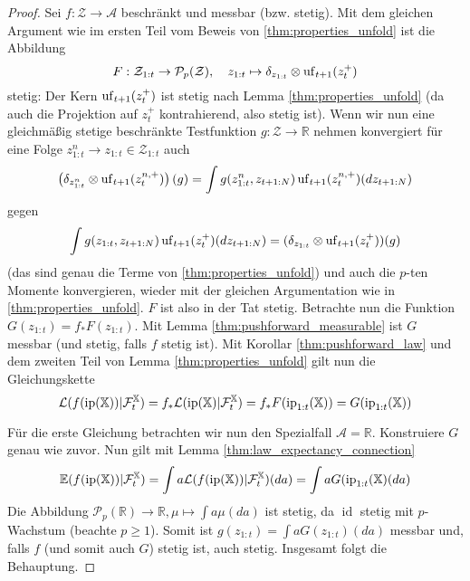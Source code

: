 \begin{proof}
Sei $f:\mathcal{Z}\rightarrow \mathcal{A}$ beschränkt und messbar (bzw. stetig). Mit dem gleichen Argument wie im ersten Teil vom Beweis von \ref{thm:properties_unfold} ist die Abbildung 
$$F:\mathcal{Z}_{1:t}\rightarrow\mathcal{P}_p(\mathcal{Z}), \quad z_{1:t}\mapsto \delta_{z_{1:t}} \otimes \operatorname{uf}_{t+1}(z_t^+)$$ 
stetig: Der Kern $\operatorname{uf}_{t+1}(z_t^+)$ ist stetig nach Lemma \ref{thm:properties_unfold} (da auch die Projektion auf $z_t^+$ kontrahierend, also stetig ist). Wenn wir nun eine gleichmäßig stetige beschränkte Testfunktion $g:\mathcal{Z}\rightarrow\mathbb{R}$ nehmen konvergiert für eine Folge $z_{1:t}^n\rightarrow z_{1:t}\in\mathcal{Z}_{1:t}$ auch
$$\left(\delta_{z_{1:t}^n}\otimes \operatorname{uf}_{t+1}(z_t^{n, +})\right)(g) = \int g(z_{1:t}^n, z_{t+1:N})\operatorname{uf}_{t+1}(z_t^{n, +})(dz_{t+1:N})$$
gegen 
$$\int g(z_{1:t}, z_{t+1:N})\operatorname{uf}_{t+1}(z_t^+)(dz_{t+1:N})=(\delta_{z_{1:t}} \otimes \operatorname{uf}_{t+1}(z_t^+))(g)$$
(das sind genau die Terme von \ref{thm:properties_unfold}) und auch die $p$-ten Momente konvergieren, wieder mit der gleichen Argumentation wie in \ref{thm:properties_unfold}. $F$ ist also in der Tat stetig. Betrachte nun die Funktion $G(z_{1:t}) = f_*F(z_{1:t})$. Mit Lemma \ref{thm:pushforward_measurable} ist $G$ messbar (und stetig, falls $f$ stetig ist). Mit Korollar \ref{thm:pushforward_law} und dem zweiten Teil von Lemma \ref{thm:properties_unfold} gilt nun die Gleichungskette
$$\mathcal{L}(f(\operatorname{ip}(\mathbb{X}))\vert \mathcal{F}_t^\mathbb{X}) = f_*\mathcal{L}(\operatorname{ip}(\mathbb{X}) \vert \mathcal{F}_t^\mathbb{X}) = f_*F(\operatorname{ip}_{1:t}(\mathbb{X}))=G(\operatorname{ip}_{1:t}(\mathbb{X}))$$

Für die erste Gleichung betrachten wir nun den Spezialfall $\mathcal{A}=\mathbb{R}$. Konstruiere $G$ genau wie zuvor. Nun gilt mit Lemma \ref{thm:law_expectancy_connection}
$$\mathbb{E}(f(\operatorname{ip}(\mathbb{X}))\vert \mathcal{F}_t^\mathbb{X}) = \int a \mathcal{L}(f(\operatorname{ip}(\mathbb{X}))\vert \mathcal{F}_t^\mathbb{X})(da) = \int a G(\operatorname{ip}_{1:t}(\mathbb{X})(da)$$
Die Abbildung $\mathcal{P}_p(\mathbb{R}) \rightarrow \mathbb{R}, \mu \mapsto \int a \mu(da)$ ist stetig, da $\operatorname{id}$ stetig mit $p$-Wachstum (beachte $p\geq 1$). Somit ist $g(z_{1:t}) = \int a G(z_{1:t})(da)$ messbar und, falls $f$ (und somit auch $G$) stetig ist, auch stetig. Insgesamt folgt die Behauptung.
\end{proof}

